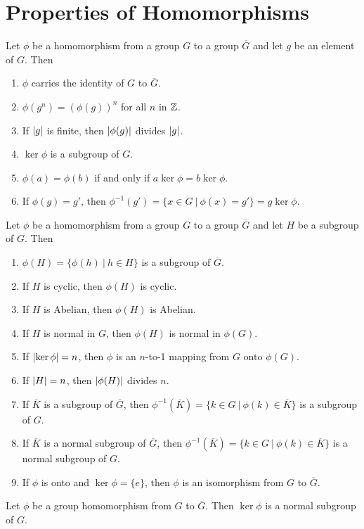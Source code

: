 \section{Properties of Homomorphisms}

\begin{theorem}
	Let $\phi$ be a homomorphism from a group $G$ to a group $\overline{G}$ and let $g$ be an element of $G$. Then
	\begin{enumerate}
		\item $\phi$ carries the identity of $G$ to $\overline{G}$.
		\item $\phi(g^n)=(\phi(g))^n$ for all $n$ in $\mathbb{Z}$.
		\item If $\left\lvert g \right\rvert$ is finite, then $\left\lvert \phi(g) \right\rvert$ divides $\left\lvert g \right\rvert$.
		\item $\ker\phi$ is a subgroup of $G$.
		\item $\phi(a) = \phi(b)$ if and only if $a\ker\phi = b\ker\phi$.
		\item If $\phi(g) = g'$, then $\phi^{-1}(g') = \{x \in G\ \vert\ \phi(x) = g'\} = g\ker\phi$.
	\end{enumerate}
\end{theorem}

\begin{theorem}
	Let $\phi$ be a homomorphism from a group $G$ to a group $\overline{G}$ and let $H$ be a subgroup of $G$. Then
	\begin{enumerate}
		\item $\phi(H) = \{\phi(h)\ \vert\ h \in H\}$ is a subgroup of $\overline{G}$.
		\item If $H$ is cyclic, then $\phi(H)$ is cyclic.
		\item If $H$ is Abelian, then $\phi(H)$ is Abelian.
		\item If $H$ is normal in $G$, then $\phi(H)$ is normal in $\phi(G)$.
		\item If $\left\lvert \ker\phi \right\rvert = n$, then $\phi$ is an $n$-to-1 mapping from $G$ onto $\phi(G)$.
		\item If $\left\lvert H \right\rvert = n$, then $\left\lvert \phi(H) \right\rvert$ divides $n$.
		\item If $\overline{K}$ is a subgroup of $\overline{G}$, then $\phi^{-1}(\overline{K})=\{k \in G\ \vert\ \phi(k) \in \overline{K}\}$ is a subgroup of $G$.
		\item If $\overline{K}$ is a normal subgroup of $\overline{G}$, then $\phi^{-1}(\overline{K})=\{ k \in G\ \vert\ \phi(k) \in \overline{K}\}$ is a normal subgroup of $G$.
		\item If $\phi$ is onto and $\ker\phi = \{e\}$, then $\phi$ is an isomorphism from $G$ to $\overline{G}$.
	\end{enumerate}
\end{theorem}

\begin{corollary}
	Let $\phi$ be a group homomorphism from $G$ to $\overline{G}$. Then $\ker\phi$ is a normal subgroup of $G$.
\end{corollary}
